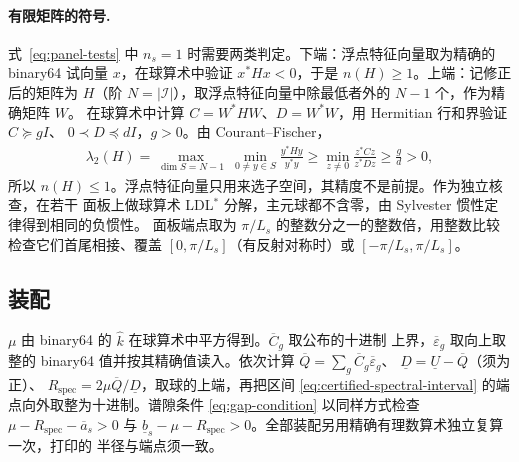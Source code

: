 \paragraph{有限矩阵的符号.}
式~\eqref{eq:panel-tests} 中 $n_s=1$ 时需要两类判定。下端：浮点特征向量取为精确的
binary64 试向量 $x$，在球算术中验证 $x^*Hx<0$，于是 $n(H)\geq1$。上端：记修正后的矩阵为
$H$（阶 $N=|\mathcal I|$），取浮点特征向量中除最低者外的 $N-1$ 个，作为精确矩阵 $W$。
在球算术中计算 $C=W^*HW$、$D=W^*W$，用 Hermitian 行和界验证 $C\succeq gI$、
$0\prec D\preceq dI$，$g>0$。由 Courant--Fischer，
\begin{align*}
  \lambda_2(H)
  =\max_{\dim S=N-1}\ \min_{0\neq y\in S}\frac{y^*Hy}{y^*y}
  \geq\min_{z\neq0}\frac{z^*Cz}{z^*Dz}\geq\frac gd>0,
\end{align*}
所以 $n(H)\leq1$。浮点特征向量只用来选子空间，其精度不是前提。作为独立核查，在若干
面板上做球算术 LDL$^*$ 分解，主元球都不含零，由 Sylvester 惯性定律得到相同的负惯性。
面板端点取为 $\pi/L_s$ 的整数分之一的整数倍，用整数比较检查它们首尾相接、覆盖 $[0,\pi/L_s]$（有反射对称时）或 $[-\pi/L_s,\pi/L_s]$。

\subsection{装配}
\label{app:reliable-assembly}

$\mu$ 由 binary64 的 $\widehat k$ 在球算术中平方得到。$\overline C_g$ 取公布的十进制
上界，$\overline\varepsilon_g$ 取向上取整的 binary64 值并按其精确值读入。依次计算
$\overline Q=\sum_g\overline C_g\overline\varepsilon_g$、
$\underline D=\underline U-\overline Q$（须为正）、
$R_{\mathrm{spec}}=2\mu\overline Q/\underline D$，取球的上端，再把区间
\eqref{eq:certified-spectral-interval} 的端点向外取整为十进制。谱隙条件
\eqref{eq:gap-condition} 以同样方式检查 $\mu-R_{\mathrm{spec}}-\overline a_s>0$ 与
$\underline b_s-\mu-R_{\mathrm{spec}}>0$。全部装配另用精确有理数算术独立复算一次，打印的
半径与端点须一致。
